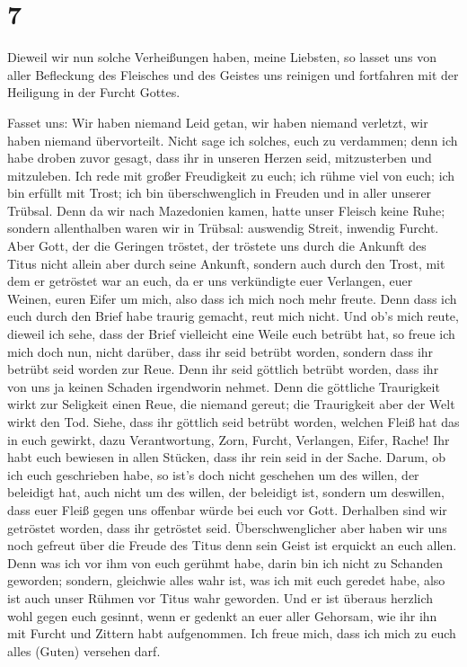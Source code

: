 \hypertarget{section-6}{%
\section{7}\label{section-6}}

 Dieweil wir nun solche Verheißungen haben, meine
Liebsten, so lasset uns von aller Befleckung des Fleisches und des
Geistes uns reinigen und fortfahren mit der Heiligung in der Furcht
Gottes.

 Fasset uns: Wir haben niemand Leid getan, wir haben
niemand verletzt, wir haben niemand übervorteilt.  Nicht
sage ich solches, euch zu verdammen; denn ich habe droben zuvor gesagt,
dass ihr in unseren Herzen seid, mitzusterben und mitzuleben.
 Ich rede mit großer Freudigkeit zu euch; ich rühme viel
von euch; ich bin erfüllt mit Trost; ich bin überschwenglich in Freuden
und in aller unserer Trübsal.  Denn da wir nach Mazedonien
kamen, hatte unser Fleisch keine Ruhe; sondern allenthalben waren wir in
Trübsal: auswendig Streit, inwendig Furcht.  Aber Gott,
der die Geringen tröstet, der tröstete uns durch die Ankunft des Titus
 nicht allein aber durch seine Ankunft, sondern auch durch
den Trost, mit dem er getröstet war an euch, da er uns verkündigte euer
Verlangen, euer Weinen, euren Eifer um mich, also dass ich mich noch
mehr freute.  Denn dass ich euch durch den Brief habe
traurig gemacht, reut mich nicht. Und ob's mich reute, dieweil ich sehe,
dass der Brief vielleicht eine Weile euch betrübt hat,  so
freue ich mich doch nun, nicht darüber, dass ihr seid betrübt worden,
sondern dass ihr betrübt seid worden zur Reue. Denn ihr seid göttlich
betrübt worden, dass ihr von uns ja keinen Schaden irgendworin nehmet.
 Denn die göttliche Traurigkeit wirkt zur Seligkeit einen
Reue, die niemand gereut; die Traurigkeit aber der Welt wirkt den Tod.
 Siehe, dass ihr göttlich seid betrübt worden, welchen
Fleiß hat das in euch gewirkt, dazu Verantwortung, Zorn, Furcht,
Verlangen, Eifer, Rache! Ihr habt euch bewiesen in allen Stücken, dass
ihr rein seid in der Sache.  Darum, ob ich euch
geschrieben habe, so ist's doch nicht geschehen um des willen, der
beleidigt hat, auch nicht um des willen, der beleidigt ist, sondern um
deswillen, dass euer Fleiß gegen uns offenbar würde bei euch vor Gott.
 Derhalben sind wir getröstet worden, dass ihr getröstet
seid. Überschwenglicher aber haben wir uns noch gefreut über die Freude
des Titus denn sein Geist ist erquickt an euch allen. 
Denn was ich vor ihm von euch gerühmt habe, darin bin ich nicht zu
Schanden geworden; sondern, gleichwie alles wahr ist, was ich mit euch
geredet habe, also ist auch unser Rühmen vor Titus wahr geworden.
 Und er ist überaus herzlich wohl gegen euch gesinnt,
wenn er gedenkt an euer aller Gehorsam, wie ihr ihn mit Furcht und
Zittern habt aufgenommen.  Ich freue mich, dass ich mich
zu euch alles (Guten) versehen darf.

